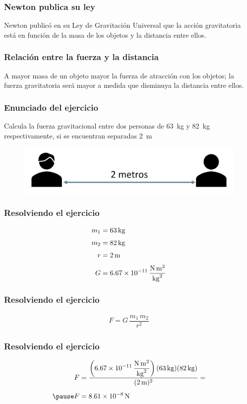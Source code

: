 \documentclass[14pt]{beamer}
\begin{document}
\begin{frame}
\frametitle{Newton publica su ley}
Newton publicó en su Ley de Gravitación Universal que la acción gravitatoria está en función de la masa de los objetos y la distancia entre ellos.
\end{frame}
\begin{frame}
\frametitle{Relación entre la fuerza y la distancia}
A mayor masa de un objeto mayor la fuerza de atracción con los objetos; \pause la fuerza gravitatoria será mayor a medida que disminuya la distancia entre ellos.
\end{frame}
\begin{frame}
\frametitle{Enunciado del ejercicio}
Calcula la fuerza gravitacional entre dos personas de \SI{63}{\kilo\gram} y \SI{82}{\kilo\gram} respectivamente, si se encuentran separadas \SI{2}{\meter}
\begin{figure}
    \centering
    \includegraphics[scale=0.8]{Imagenes/Gravitacion_Universal_01.png}
\end{figure}
\end{frame}
\begin{frame}
\frametitle{Resolviendo el ejercicio}
\begin{align*}
m_{1} &= \SI{63}{\kilo\gram} \\[0.3em]
m_{2} &= \SI{82}{\kilo\gram} \\[0.3em]
r &= \SI{2}{\meter} \\[0.3em]
G &= \SI[per-mode=fraction]{6.67d-11}{\newton\square\meter\per\square\kilo\gram}
\end{align*}
\end{frame}
\begin{frame}
\frametitle{Resolviendo el ejercicio}
\pause
\begin{align*}
F = G \, \dfrac{m_{1} \, m_{2}}{r^{2}}
\end{align*}
\end{frame}
\begin{frame}
\frametitle{Resolviendo el ejercicio}
\pause
\begin{eqnarray*}
\begin{aligned}
F &= \dfrac{\left( \displaystyle \SI[per-mode=fraction]{6.67d-11}{\newton\square\meter\per\square\kilo\gram}\right)  (\SI{63}{\kilo\gram})(\SI{82}{\kilo\gram}) }{(\SI{2}{\meter})^{2}} = \\[0.5em] \pause
F &= \SI{8.61d-8}{\newton}
\end{aligned}
\end{eqnarray*}
\end{frame}
\end{document}

